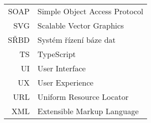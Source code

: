 \begin{longtable}{rl}
SOAP & Simple Object Access Protocol\\
SVG & Scalable Vector Graphics\\
SŘBD & Systém řízení báze dat\\
TS & TypeScript\\
UI & User Interface\\
UX & User Experience\\
URL & Uniform Resource Locator\\
XML & Extensible Markup Language\\
\end{longtable}